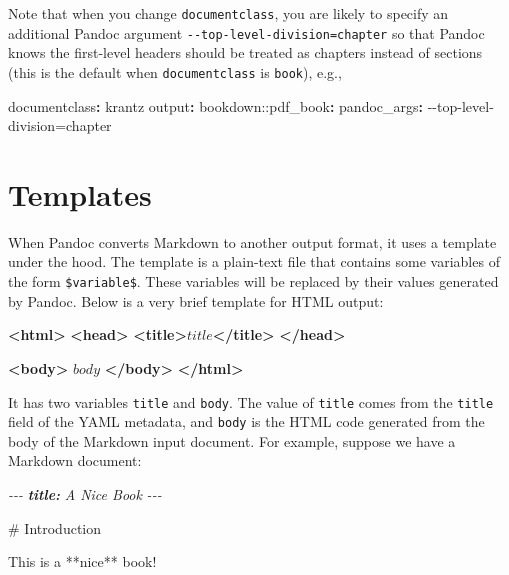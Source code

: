 \documentclass[
  12pt,
]{krantz}
\newenvironment{Shaded}{\begin{snugshade}}{\end{snugshade}}
\newcommand{\AnnotationTok}[1]{\textcolor[rgb]{0.56,0.35,0.01}{\textbf{\textit{#1}}}}
\newcommand{\AttributeTok}[1]{\textcolor[rgb]{0.77,0.63,0.00}{#1}}
\newcommand{\CommentTok}[1]{\textcolor[rgb]{0.56,0.35,0.01}{\textit{#1}}}
\newcommand{\FunctionTok}[1]{\textcolor[rgb]{0.00,0.00,0.00}{#1}}
\newcommand{\KeywordTok}[1]{\textcolor[rgb]{0.13,0.29,0.53}{\textbf{#1}}}
\newcommand{\NormalTok}[1]{#1}
\theoremstyle{definition}
\theoremstyle{definition}
\theoremstyle{definition}
\theoremstyle{definition}
\theoremstyle{remark}
\begin{document}
Note that when you change \texttt{documentclass}, you are likely to specify an additional Pandoc argument \texttt{-\/-top-level-division=chapter} so that Pandoc knows the first-level headers should be treated as chapters instead of sections (this is the default when \texttt{documentclass} is \texttt{book}), e.g.,

\begin{Shaded}
\begin{Highlighting}[]
\FunctionTok{documentclass}\KeywordTok{:}\AttributeTok{ krantz}
\FunctionTok{output}\KeywordTok{:}
\AttributeTok{  bookdown:}\FunctionTok{:pdf\_book}\KeywordTok{:}
\AttributeTok{    }\FunctionTok{pandoc\_args}\KeywordTok{:}\AttributeTok{ {-}{-}top{-}level{-}division=chapter}
\end{Highlighting}
\end{Shaded}

\hypertarget{templates}{%
\section{Templates}\label{templates}}

When Pandoc converts Markdown to another output format, it uses a template under the hood. The template is a plain-text file that contains some variables of the form \texttt{\$variable\$}. These variables will be replaced by their values generated by Pandoc. Below is a very brief template for HTML output:

\begin{Shaded}
\begin{Highlighting}[]
\KeywordTok{\textless{}html\textgreater{}}
  \KeywordTok{\textless{}head\textgreater{}}
    \KeywordTok{\textless{}title\textgreater{}}\NormalTok{$title$}\KeywordTok{\textless{}/title\textgreater{}}
  \KeywordTok{\textless{}/head\textgreater{}}
  
  \KeywordTok{\textless{}body\textgreater{}}
\NormalTok{  $body$}
  \KeywordTok{\textless{}/body\textgreater{}}
\KeywordTok{\textless{}/html\textgreater{}}
\end{Highlighting}
\end{Shaded}

It has two variables \texttt{title} and \texttt{body}. The value of \texttt{title} comes from the \texttt{title} field of the YAML metadata, and \texttt{body} is the HTML code generated from the body of the Markdown input document. For example, suppose we have a Markdown document:

\begin{Shaded}
\begin{Highlighting}[]
\CommentTok{{-}{-}{-}}
\AnnotationTok{title:}\CommentTok{ A Nice Book}
\CommentTok{{-}{-}{-}}

\FunctionTok{\# Introduction}

\NormalTok{This is a **nice** book!}
\end{Highlighting}
\end{Shaded}
\end{document}
